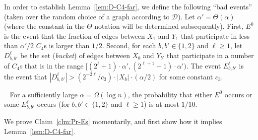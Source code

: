  In order to establish Lemma~\ref{lem:D-C4-far},
 we define the following ``bad events'' (taken over the random choice of a graph according to $\mathcal{D}$). Let $\alpha' = \Theta(\alpha)$ (where the constant in the $\Theta$ notation will be determined subsequently).
First, $E^0$ is the event that the fraction of edges between $X_1$ and $Y_1$ that participate in less than $\alpha'/2$ $C_4$s is larger than $1/2$.
Second, for each $b,b' \in \{1,2\}$ and $\ell \geq 1$, let $D_{b,b'}^\ell$ be the set (\emph{bucket}) of edges between $X_b$ and $Y_{b'}$ that participate in a number of $C_4$s that is in the range $[(2^\ell+1)\cdot \alpha', (2^{\ell+1}+1)\cdot \alpha')$.
The event $E_{b,b'}^\ell$ is the event that $|D_{b,b'}^\ell| > (2^{-2\ell}/c_3)\cdot |X_b|\cdot (\alpha/2)$ for some constant $c_3$.

\begin{claim}~\label{clm:Pr-Es}
For a sufficiently large $\alpha = \Omega(\log n)$,
the probability that either $E^0$ occurs or some $E_{b,b'}^\ell$ occurs (for $b,b' \in \{1,2\}$ and $\ell \geq 1$) is at most $1/10$.
\end{claim}
We prove Claim~\ref{clm:Pr-Es} momentarily, and first show how it implies Lemma~\ref{lem:D-C4-far}.


